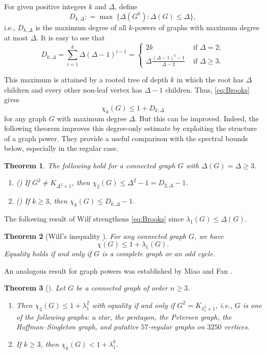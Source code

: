 \documentclass[11pt]{article}
\theoremstyle{plain}
\newtheorem{theorem}{Theorem}[section]
\numberwithin{equation}{section}
\begin{document}
For given positive integers $k$ and $\Delta$, define 
\[ D_{k, \Delta}: = \max\ \{\Delta(G^k): \Delta(G)\le \Delta\},\]
i.e., $D_{k, \Delta}$ is the maximum degree of all $k$-powers of graphs with maximum degree at most $\Delta$. It is easy to see that 
\[ D_{k, \Delta} = \sum_{i=1}^k \Delta(\Delta - 1)^{i-1} =
\begin{cases}
  2k & \text{ if }\Delta =2;\\
  \Delta \frac{(\Delta-1)^k - 1}{\Delta - 2} & \text{ if }\Delta \ge 3.
\end{cases} \]

This maximum is attained by a rooted tree of depth $k$ in which the root has $\Delta$ children and every other non-leaf vertex has $\Delta-1$ children. Thus, \eqref{eq:Brooks} gives
\[\chi_k(G)\le 1 + D_{k, \Delta}\]
for any graph $G$ with maximum degree $\Delta$. But this can be improved. Indeed, the following theorem improves this degree-only estimate by exploiting the structure of a graph power. They provide a useful comparison with the spectral bounds below, especially in the regular case.

\begin{theorem} The following hold for a connected graph $G$ with $\Delta(G) = \Delta \ge 3$.  
\begin{enumerate}[$(i)$]
    \item (\cite{Cranston_Rabern_2016}) If $G^2 \neq K_{\Delta^2 +1}$, then $\chi_2(G)\le \Delta^2 -1 = D_{2, \Delta}-1$.
    \item (\cite{Bonamy_Bousquet_2014}) If $k\ge 3$, then $\chi_k(G)\le D_{k, \Delta} - 1$.
\end{enumerate}
\end{theorem}

The following result of Wilf \cite{Wilf_1967} strengthens \eqref{eq:Brooks} since $\lambda_1(G)\le \Delta(G)$.
 
\begin{theorem}[Wilf's inequality \cite{Wilf_1967}]\label{thm:Wilf}
For any connected graph $G$, we have 
    \[ \chi(G) \le 1 + \lambda_1(G).\]
Equality holds if and only if $G$ is a complete graph or an odd cycle.  
\end{theorem}

An analogous result for graph powers was established by Miao and Fan \cite{Miao_Fan_2014}.

\begin{theorem}[\cite{Miao_Fan_2014}]\label{thm:wilf_type_bound_graph_powers}
        Let $G$ be a connected graph of order $n\ge 3$. 
    \begin{enumerate}[$(i)$]
        \item Then $\chi_2(G)\le 1 + \lambda_1^2$ with equality if and only if $G^2 = K_{\lambda_1^2 + 1}$, i.e., $G$ is one of the following graphs: a star, the pentagon, the Petersen graph, the Hoffman–Singleton graph, and putative $57$-regular graphs on $3250$ vertices. 
        \item If $k\ge 3$, then $\chi_k(G) < 1 + \lambda_1^k$. 
    \end{enumerate}
\end{theorem}
\end{document}
